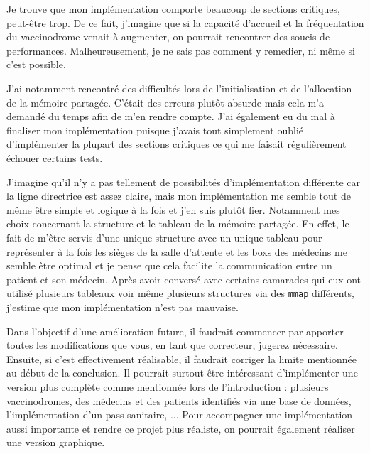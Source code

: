 \documentclass[a4paper]{article}
\begin{document}
Je trouve que mon implémentation comporte beaucoup de sections critiques, peut-être trop. De ce fait, j'imagine que si la capacité d'accueil et la fréquentation du vaccinodrome venait à augmenter, on pourrait rencontrer des soucis de performances. Malheureusement, je ne sais pas comment y remedier, ni même si c'est possible.
\bigskip \par J'ai notamment rencontré des difficultés lors de l'initialisation et de l'allocation de la mémoire partagée. C'était des erreurs plutôt absurde mais cela m'a demandé du temps afin de m'en rendre compte. J'ai également eu du mal à finaliser mon implémentation puisque j'avais tout simplement oublié d'implémenter la plupart des sections critiques ce qui me faisait régulièrement échouer certains tests.
\bigskip \par J'imagine qu'il n'y a pas tellement de possibilités d'implémentation différente car la ligne directrice est assez claire, mais mon implémentation me semble tout de même être simple et logique à la fois et j'en suis plutôt fier. Notamment mes choix concernant la structure et le tableau de la mémoire partagée. En effet, le fait de m'être servis d'une unique structure avec un unique tableau pour représenter à la fois les sièges de la salle d'attente et les boxs des médecins me semble être optimal et je pense que cela facilite la communication entre un patient et son médecin. Après avoir conversé avec certains camarades qui eux ont utilisé plusieurs tableaux voir même plusieurs structures via des \texttt{mmap} différents, j'estime que mon implémentation n'est pas mauvaise.
\bigskip \par Dans l'objectif d'une amélioration future, il faudrait commencer par apporter toutes les modifications que vous, en tant que correcteur, jugerez nécessaire. Ensuite, si c'est effectivement réalisable, il faudrait corriger la limite mentionnée au début de la conclusion. Il pourrait surtout être intéressant d'implémenter une version plus complète comme mentionnée lors de l'introduction : plusieurs vaccinodromes, des médecins et des patients identifiés via une base de données, l'implémentation d'un pass sanitaire, ... Pour accompagner une implémentation aussi importante et rendre ce projet plus réaliste, on pourrait également réaliser une version graphique.
\end{document}
